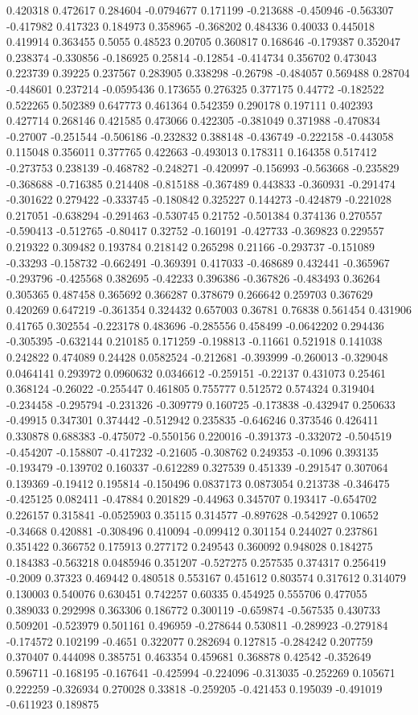 0.420318 0.472617 0.284604 -0.0794677 0.171199 -0.213688 -0.450946 -0.563307 -0.417982 0.417323 0.184973 0.358965 -0.368202 0.484336 0.40033 0.445018 0.419914 0.363455 0.5055 0.48523 0.20705 0.360817 0.168646 -0.179387 0.352047 0.238374 -0.330856 -0.186925 0.25814 -0.12854 -0.414734 0.356702 0.473043 0.223739 0.39225 0.237567 0.283905 0.338298 -0.26798 -0.484057 0.569488 0.28704 -0.448601 0.237214 -0.0595436 0.173655 0.276325 0.377175 0.44772 -0.182522 0.522265 0.502389 0.647773 0.461364 0.542359 0.290178 0.197111 0.402393 0.427714 0.268146 0.421585 0.473066 0.422305 -0.381049 0.371988 -0.470834 -0.27007 -0.251544 -0.506186 -0.232832 0.388148 -0.436749 -0.222158 -0.443058 0.115048 0.356011 0.377765 0.422663 -0.493013 0.178311 0.164358 0.517412 -0.273753 0.238139 -0.468782 -0.248271 -0.420997 -0.156993 -0.563668 -0.235829 -0.368688 -0.716385 0.214408 -0.815188 -0.367489 0.443833 -0.360931 -0.291474 -0.301622 0.279422 -0.333745 -0.180842 0.325227 0.144273 -0.424879 -0.221028 0.217051 -0.638294 -0.291463 -0.530745 0.21752 -0.501384 0.374136 0.270557 -0.590413 -0.512765 -0.80417 0.32752 -0.160191 -0.427733 -0.369823 0.229557 0.219322 0.309482 0.193784 0.218142 0.265298 0.21166 -0.293737 -0.151089 -0.33293 -0.158732 -0.662491 -0.369391 0.417033 -0.468689 0.432441 -0.365967 -0.293796 -0.425568 0.382695 -0.42233 0.396386 -0.367826 -0.483493 0.36264 0.305365 0.487458 0.365692 0.366287 0.378679 0.266642 0.259703 0.367629 0.420269 0.647219 -0.361354 0.324432 0.657003 0.36781 0.76838 0.561454 0.431906 0.41765 0.302554 -0.223178 0.483696 -0.285556 0.458499 -0.0642202 0.294436 -0.305395 -0.632144 0.210185 0.171259 -0.198813 -0.11661 0.521918 0.141038 0.242822 0.474089 0.24428 0.0582524 -0.212681 -0.393999 -0.260013 -0.329048 0.0464141 0.293972 0.0960632 0.0346612 -0.259151 -0.22137 0.431073 0.25461 0.368124 -0.26022 -0.255447 0.461805 0.755777 0.512572 0.574324 0.319404 -0.234458 -0.295794 -0.231326 -0.309779 0.160725 -0.173838 -0.432947 0.250633 -0.49915 0.347301 0.374442 -0.512942 0.235835 -0.646246 0.373546 0.426411 0.330878 0.688383 -0.475072 -0.550156 0.220016 -0.391373 -0.332072 -0.504519 -0.454207 -0.158807 -0.417232 -0.21605 -0.308762 0.249353 -0.1096 0.393135 -0.193479 -0.139702 0.160337 -0.612289 0.327539 0.451339 -0.291547 0.307064 0.139369 -0.19412 0.195814 -0.150496 0.0837173 0.0873054 0.213738 -0.346475 -0.425125 0.082411 -0.47884 0.201829 -0.44963 0.345707 0.193417 -0.654702 0.226157 0.315841 -0.0525903 0.35115 0.314577 -0.897628 -0.542927 0.10652 -0.34668 0.420881 -0.308496 0.410094 -0.099412 0.301154 0.244027 0.237861 0.351422 0.366752 0.175913 0.277172 0.249543 0.360092 0.948028 0.184275 0.184383 -0.563218 0.0485946 0.351207 -0.527275 0.257535 0.374317 0.256419 -0.2009 0.37323 0.469442 0.480518 0.553167 0.451612 0.803574 0.317612 0.314079 0.130003 0.540076 0.630451 0.742257 0.60335 0.454925 0.555706 0.477055 0.389033 0.292998 0.363306 0.186772 0.300119 -0.659874 -0.567535 0.430733 0.509201 -0.523979 0.501161 0.496959 -0.278644 0.530811 -0.289923 -0.279184 -0.174572 0.102199 -0.4651 0.322077 0.282694 0.127815 -0.284242 0.207759 0.370407 0.444098 0.385751 0.463354 0.459681 0.368878 0.42542 -0.352649 0.596711 -0.168195 -0.167641 -0.425994 -0.224096 -0.313035 -0.252269 0.105671 0.222259 -0.326934 0.270028 0.33818 -0.259205 -0.421453 0.195039 -0.491019 -0.611923 0.189875 